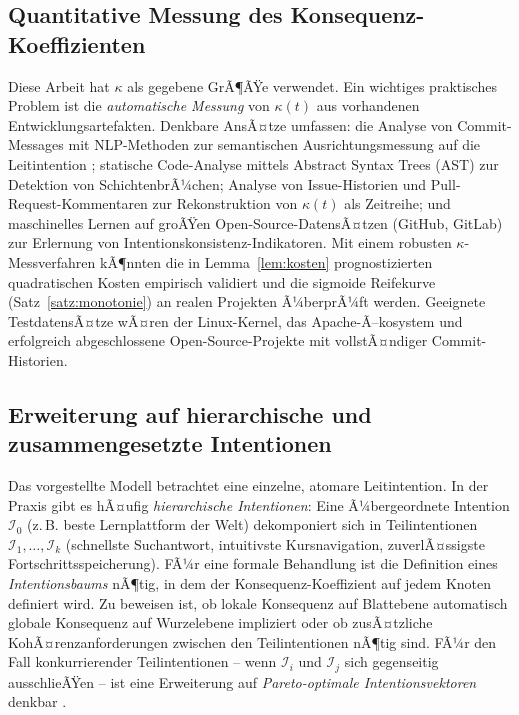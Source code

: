 ﻿\documentclass[a4paper,12pt]{article}
\theoremstyle{definition}
\begin{document}
\subsection{Quantitative Messung des Konsequenz-Koeffizienten}

Diese Arbeit hat $\kappa$ als gegebene GrÃ¶ÃŸe verwendet. Ein wichtiges
praktisches Problem ist die \emph{automatische Messung} von $\kappa(t)$
aus vorhandenen Entwicklungsartefakten. Denkbare AnsÃ¤tze umfassen:
die Analyse von Commit-Messages mit NLP-Methoden zur semantischen
Ausrichtungsmessung auf die Leitintention \cite{devlin2019bert};
statische Code-Analyse mittels Abstract Syntax Trees (AST) zur
Detektion von SchichtenbrÃ¼chen; Analyse von Issue-Historien und
Pull-Request-Kommentaren zur Rekonstruktion von $\kappa(t)$ als
Zeitreihe; und maschinelles Lernen auf groÃŸen Open-Source-DatensÃ¤tzen
(GitHub, GitLab) zur Erlernung von Intentionskonsistenz-Indikatoren.
Mit einem robusten $\kappa$-Messverfahren kÃ¶nnten die in Lemma~\ref{lem:kosten}
prognostizierten quadratischen Kosten empirisch validiert und die
sigmoide Reifekurve (Satz~\ref{satz:monotonie}) an realen Projekten
Ã¼berprÃ¼ft werden. Geeignete TestdatensÃ¤tze wÃ¤ren der Linux-Kernel,
das Apache-Ã–kosystem und erfolgreich abgeschlossene Open-Source-Projekte
mit vollstÃ¤ndiger Commit-Historien.

\subsection{Erweiterung auf hierarchische und zusammengesetzte Intentionen}

Das vorgestellte Modell betrachtet eine einzelne, atomare Leitintention.
In der Praxis gibt es hÃ¤ufig \emph{hierarchische Intentionen}: Eine
Ã¼bergeordnete Intention $\mathcal{I}_0$ (z.\,B. \glqq{}beste Lernplattform
der Welt\grqq{}) dekomponiert sich in Teilintentionen $\mathcal{I}_1, \ldots,
\mathcal{I}_k$ (\glqq{}schnellste Suchantwort\grqq{}, \glqq{}intuitivste Kursnavigation\grqq{},
\glqq{}zuverlÃ¤ssigste Fortschrittsspeicherung\grqq{}). FÃ¼r eine formale Behandlung
ist die Definition eines \emph{Intentionsbaums} nÃ¶tig, in dem der
Konsequenz-Koeffizient auf jedem Knoten definiert wird. Zu beweisen
ist, ob lokale Konsequenz auf Blattebene automatisch globale Konsequenz
auf Wurzelebene impliziert oder ob zusÃ¤tzliche KohÃ¤renzanforderungen
zwischen den Teilintentionen nÃ¶tig sind. FÃ¼r den Fall konkurrierender
Teilintentionen -- wenn $\mathcal{I}_i$ und $\mathcal{I}_j$ sich gegenseitig
ausschlieÃŸen -- ist eine Erweiterung auf \emph{Pareto-optimale
Intentionsvektoren} denkbar \cite{osborne1994gametheory}.
\end{document}
